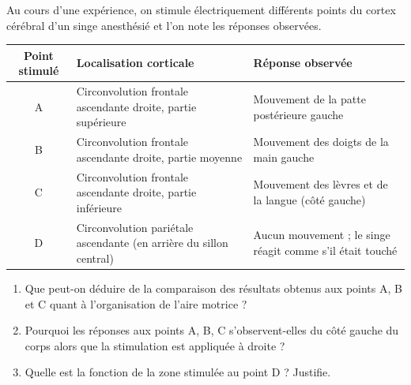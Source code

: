 \documentclass[11pt]{article}
\begin{document}
\begin{exercice}
Au cours d'une expérience, on stimule électriquement différents points du cortex cérébral d'un singe anesthésié et l'on note les réponses observées.

\begin{center}
\begin{tabularx}{\linewidth}{|c|X|X|}
\hline
\rowcolor{popblueL} Point stimulé & Localisation corticale & Réponse observée \\
\hline
A & Circonvolution frontale ascendante droite, partie supérieure & Mouvement de la patte postérieure gauche \\
\hline
B & Circonvolution frontale ascendante droite, partie moyenne & Mouvement des doigts de la main gauche \\
\hline
C & Circonvolution frontale ascendante droite, partie inférieure & Mouvement des lèvres et de la langue (côté gauche) \\
\hline
D & Circonvolution pariétale ascendante (en arrière du sillon central) & Aucun mouvement ; le singe réagit comme s'il était touché \\
\hline
\end{tabularx}
\end{center}

\begin{enumerate}
\item Que peut-on déduire de la comparaison des résultats obtenus aux points A, B et C quant à l'organisation de l'aire motrice ?
\item Pourquoi les réponses aux points A, B, C s'observent-elles du côté gauche du corps alors que la stimulation est appliquée à droite ?
\item Quelle est la fonction de la zone stimulée au point D ? Justifie.
\end{enumerate}
\end{exercice}
\end{document}

